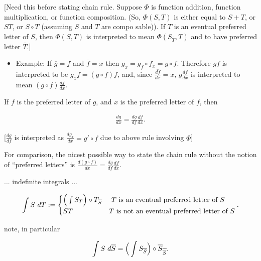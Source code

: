 \documentclass{article}
\begin{document}
\vspace{.5cm}

[Need this before stating chain rule. Suppose $\Phi$ is function addition, function multiplication, or function composition. (So, $\Phi(S, T)$ is either equal to $S + T$, or $ST$, or $S \circ T$ (assuming $S$ and $T$ are compo sable)). If $T$ is an eventual preferred letter of $S$, then $\Phi(S, T)$ is interpreted to mean $\Phi(S_{\overline{T}}, T)$ and to have preferred letter $\overline{T}$.]
\begin{itemize}
    \item Example: If $\overline{g} = f$ and $\overline{f} = x$ then $g_x = g_f \circ f_x = g \circ f$. Therefore $gf$ is interpreted to be $g_x f = (g  \circ f) f$, and, since $\overline{\frac{df}{dx}} = x$, $g \frac{df}{dx}$ is interpreted to mean $(g \circ f) \frac{df}{dx}$.
\end{itemize}

\begin{mdframed}
    If $f$ is the preferred letter of $g$, and $x$ is the preferred letter of $f$, then 
        
    \begin{align*}
        \frac{dg}{dx} = \frac{dg}{df} \frac{df}{dx}.
    \end{align*}
    
    [$\frac{dg}{df}$ is interpreted as $\frac{dg_x}{dx} = g' \circ f$ due to above rule involving $\Phi$]
\end{mdframed}

For comparison, the nicest possible way to state the chain rule without the notion of ``preferred letters'' is $\frac{d(g \circ f)}{dx} = \frac{dg}{df} \frac{df}{dx}$.

... indefinite integrals ...

\begin{align*}
    \int S \text{ } dT := 
    \begin{cases}
        \Big( \int S_T \Big) \circ T_{\overline{S}} & \text{ $T$ is an eventual preferred letter of $S$} \\
        ST & \text{$T$ is not an eventual preferred letter of $S$}
    \end{cases}.
\end{align*}

note, in particular

\begin{align*}
    \int S \text{ } d\overline{S} = \Big( \int S_{\overline{S}} \Big) \circ \overline{S}_{\overline{\overline{S}}}.
\end{align*}
\end{document}
